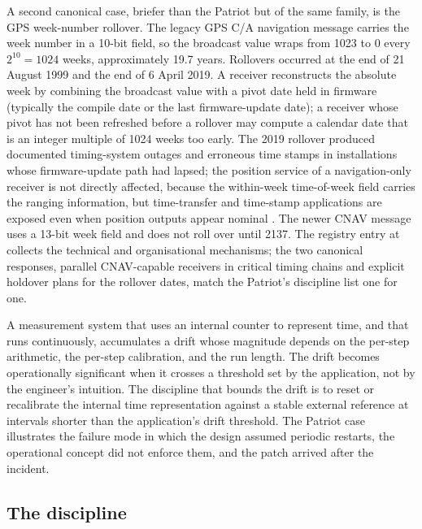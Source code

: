 A second canonical case, briefer than the Patriot but of the same
family, is the GPS week-number rollover. The legacy GPS C/A
navigation message carries the week number in a 10-bit field, so
the broadcast value wraps from 1023 to 0 every $2^{10} = 1024$
weeks, approximately 19.7 years. Rollovers occurred at the end of
21 August 1999 and the end of 6 April 2019. A receiver reconstructs
the absolute week by combining the broadcast value with a pivot
date held in firmware (typically the compile date or the last
firmware-update date); a receiver whose pivot has not been
refreshed before a rollover may compute a calendar date that is an
integer multiple of 1024 weeks too early. The 2019 rollover
produced documented timing-system outages and erroneous time
stamps in installations whose firmware-update path had lapsed; the
position service of a navigation-only receiver is not directly
affected, because the within-week time-of-week field carries the
ranging information, but time-transfer and time-stamp applications
are exposed even when position outputs appear nominal
\cite{web:gpsgov-week-rollover-2019,web:dhs-cisa-gps-rollover-2019,
web:nist-gps-week-rollover-2019}. The newer CNAV message uses a
13-bit week field and does not roll over until 2137. The registry
entry at 
collects the technical and organisational mechanisms; the two
canonical responses, parallel CNAV-capable receivers in critical
timing chains and explicit holdover plans for the rollover dates,
match the Patriot's discipline list one for one.

\begin{principle}
A measurement system that uses an internal counter to represent
time, and that runs continuously, accumulates a drift whose
magnitude depends on the per-step arithmetic, the per-step
calibration, and the run length. The drift becomes operationally
significant when it crosses a threshold set by the application, not
by the engineer's intuition. The discipline that bounds the drift
is to reset or recalibrate the internal time representation against
a stable external reference at intervals shorter than the
application's drift threshold. The Patriot case illustrates the
failure mode in which the design assumed periodic restarts, the
operational concept did not enforce them, and the patch arrived
after the incident.
\end{principle}

\subsection{The discipline}

